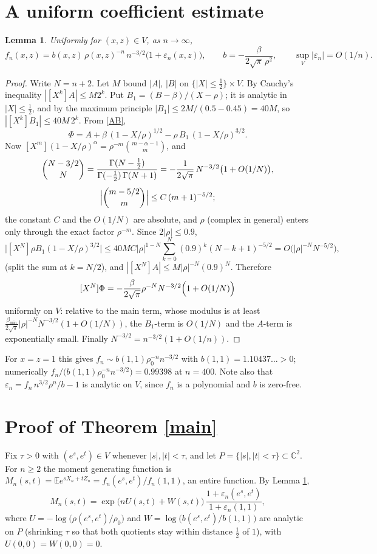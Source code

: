 \documentclass[11pt]{amsart}
\newtheorem{lemma}[theorem]{Lemma}
\theoremstyle{remark}
\newcommand{\E}{\mathbb{E}}
\newcommand{\C}{\mathbb{C}}
\begin{document}
\section{A uniform coefficient estimate}
\begin{lemma}\label{coef}
Uniformly for $(x,z)\in V$, as $n\to\infty$,
\[
f_n(x,z)=b(x,z)\,\rho(x,z)^{-n}\,n^{-3/2}\bigl(1+\varepsilon_n(x,z)\bigr),\qquad
b=-\frac{\beta}{2\sqrt\pi\,\rho^{2}},\qquad \sup_V|\varepsilon_n|=O(1/n).
\]
\end{lemma}
\begin{proof}
Write $N=n+2$. Let $M$ bound $|A|$, $|B|$ on $\{|X|\le\frac12\}\times V$. By Cauchy's inequality
$|[X^k]A|\le M2^k$. Put $B_1=(B-\beta)/(X-\rho)$; it is analytic in $|X|\le\frac12$, and by the maximum
principle $|B_1|\le 2M/(0.5-0.45)=40M$, so $|[X^k]B_1|\le 40M\,2^k$. From \eqref{AB},
\[
\Phi=A+\beta\,(1-X/\rho)^{1/2}-\rho\,B_1\,(1-X/\rho)^{3/2}.
\]
Now $[X^m](1-X/\rho)^{\alpha}=\rho^{-m}\binom{m-\alpha-1}{m}$, and
\begin{gather*}
\binom{N-3/2}{N}=\frac{\Gamma(N-\tfrac12)}{\Gamma(-\tfrac12)\,\Gamma(N+1)}=-\frac{1}{2\sqrt\pi}\,N^{-3/2}\bigl(1+O(1/N)\bigr),\\[4pt]
\Bigl|\binom{m-5/2}{m}\Bigr|\le C\,(m+1)^{-5/2};
\end{gather*}
the constant $C$ and the $O(1/N)$ are absolute, and $\rho$ (complex in general) enters only through the exact
factor $\rho^{-m}$. Since $2|\rho|\le0.9$,
\[
\bigl|[X^N]\rho B_1(1-X/\rho)^{3/2}\bigr|\le 40MC|\rho|^{1-N}\sum_{k=0}^{N}(0.9)^k(N-k+1)^{-5/2}=O\bigl(|\rho|^{-N}N^{-5/2}\bigr),
\]
(split the sum at $k=N/2$), and $|[X^N]A|\le M|\rho|^{-N}(0.9)^N$. Therefore
\[
[X^N]\Phi=-\frac{\beta}{2\sqrt\pi}\rho^{-N}N^{-3/2}\Bigl(1+O(1/N)\Bigr)
\]
uniformly on $V$: relative to the main term, whose modulus is at least
$\frac{\beta_{\min}}{2\sqrt\pi}|\rho|^{-N}N^{-3/2}(1+O(1/N))$, the $B_1$-term is $O(1/N)$ and the $A$-term is
exponentially small. Finally $N^{-3/2}=n^{-3/2}(1+O(1/n))$.
\end{proof}
For $x=z=1$ this gives $f_n\sim b(1,1)\rho_0^{-n}n^{-3/2}$ with $b(1,1)=1.10437\ldots>0$; numerically
$f_n/\bigl(b(1,1)\rho_0^{-n}n^{-3/2}\bigr)=0.99398$ at $n=400$. Note also that
$\varepsilon_n=f_n\,n^{3/2}\rho^{n}/b-1$ is analytic on $V$, since $f_n$ is a polynomial and $b$ is zero-free.

\section{Proof of Theorem \ref{main}}
Fix $\tau>0$ with $(e^s,e^t)\in V$ whenever $|s|,|t|<\tau$, and let $P=\{|s|,|t|<\tau\}\subset\C^2$. For $n\ge2$ the
moment generating function is $M_n(s,t)=\E e^{sX_n+tZ_n}=f_n(e^s,e^t)/f_n(1,1)$, an entire function. By
Lemma \ref{coef},
\begin{equation}\label{qp}
M_n(s,t)=\exp\bigl(nU(s,t)+W(s,t)\bigr)\,\frac{1+\varepsilon_n(e^s,e^t)}{1+\varepsilon_n(1,1)},
\end{equation}
where $U=-\log\bigl(\rho(e^s,e^t)/\rho_0\bigr)$ and $W=\log\bigl(b(e^s,e^t)/b(1,1)\bigr)$ are analytic on $P$ (shrinking
$\tau$ so that both quotients stay within distance $\tfrac12$ of $1$), with $U(0,0)=W(0,0)=0$.
\end{document}
